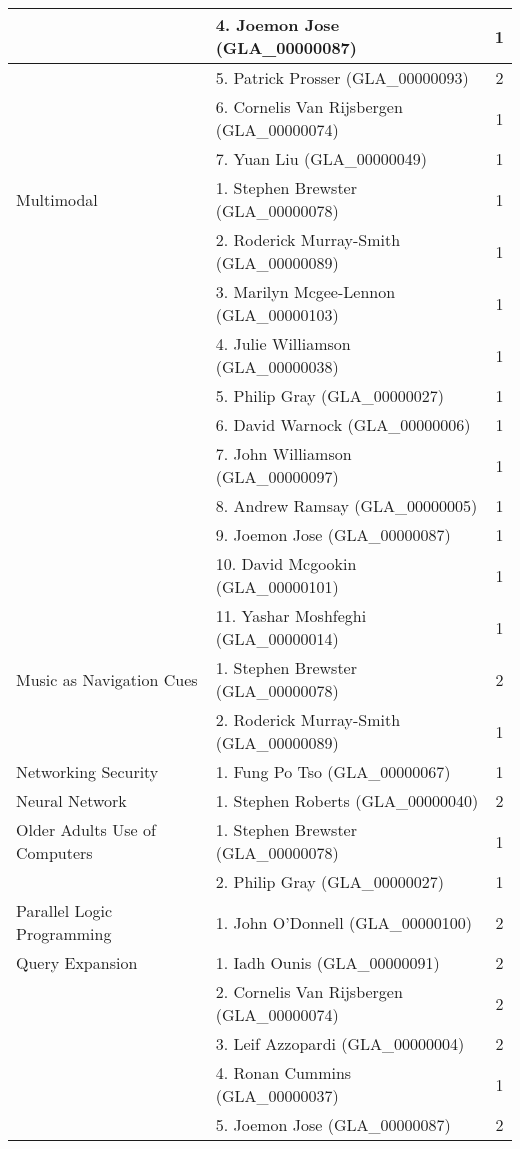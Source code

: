 \begin{longtable}{|l|l|c|}
\hline  & 4. Joemon Jose (GLA\_00000087) & 1 \\ 
\hline  & 5. Patrick Prosser (GLA\_00000093) & 2 \\ 
\hline  & 6. Cornelis Van Rijsbergen (GLA\_00000074) & 1 \\ 
\hline  & 7. Yuan Liu (GLA\_00000049) & 1 \\ 
\hline Multimodal & 1. Stephen Brewster (GLA\_00000078)  & 1 \\ 
\hline  & 2. Roderick Murray-Smith (GLA\_00000089) & 1 \\ 
\hline  & 3. Marilyn Mcgee-Lennon (GLA\_00000103) & 1 \\ 
\hline  & 4. Julie Williamson (GLA\_00000038) & 1 \\ 
\hline  & 5. Philip Gray (GLA\_00000027) & 1 \\ 
\hline  & 6. David Warnock (GLA\_00000006) & 1 \\ 
\hline  & 7. John Williamson (GLA\_00000097) & 1 \\ 
\hline  & 8. Andrew Ramsay (GLA\_00000005) & 1 \\ 
\hline  & 9. Joemon Jose (GLA\_00000087) & 1 \\ 
\hline  & 10. David Mcgookin (GLA\_00000101) & 1 \\ 
\hline  & 11. Yashar Moshfeghi (GLA\_00000014) & 1 \\ 
\hline Music as Navigation Cues & 1. Stephen Brewster (GLA\_00000078) & 2 \\ 
\hline  & 2. Roderick Murray-Smith (GLA\_00000089) & 1 \\ 
\hline Networking Security & 1. Fung Po Tso (GLA\_00000067) & 1 \\ 
\hline Neural Network & 1. Stephen Roberts (GLA\_00000040) & 2 \\ 
\hline Older Adults Use of Computers & 1. Stephen Brewster (GLA\_00000078) & 1  \\ 
\hline  & 2. Philip Gray (GLA\_00000027) & 1 \\ 
\hline Parallel Logic Programming & 1. John O'Donnell (GLA\_00000100) & 2 \\ 
\hline Query Expansion & 1. Iadh Ounis (GLA\_00000091) & 2 \\ 
\hline  & 2. Cornelis Van Rijsbergen (GLA\_00000074) & 2 \\ 
\hline  & 3. Leif Azzopardi (GLA\_00000004) & 2 \\ 
\hline  & 4. Ronan Cummins (GLA\_00000037) & 1 \\ 
\hline  & 5. Joemon Jose (GLA\_00000087) & 2 \\ 

\end{longtable}
